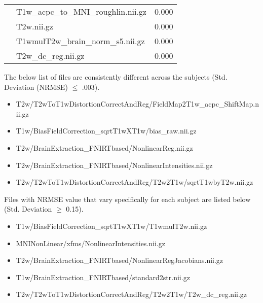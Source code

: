\begin{center}
\begin{tabularx}{\textwidth}{|l|X|X|X|X|}
                                                                & \multicolumn{2}{|l|}{T1w\_acpc\_to\_MNI\_roughlin.nii.gz}                 & \multicolumn{2}{l|}{0.000} \\\cline{2-5}
                                                                & \multicolumn{2}{|l|}{T2w.nii.gz}                            & \multicolumn{2}{l|}{0.000} \\\cline{2-5}
                                                                & \multicolumn{2}{|l|}{T1wmulT2w\_brain\_norm\_s5.nii.gz}     & \multicolumn{2}{l|}{0.000} \\\cline{2-5}
                                                                & \multicolumn{2}{|l|}{T2w\_dc\_reg.nii.gz}                   & \multicolumn{2}{l|}{0.000} \\\cline{1-5}
\end{tabularx}
\label{tab:PreFreeSurfer_comparison_table}
\end{center}
\hfill \break

The below list of files  are consistently different across the subjects (Std. Deviation (NRMSE) $\leq$ .003).
\begin{itemize} 
  \item T2w/T2wToT1wDistortionCorrectAndReg/FieldMap2T1w\_acpc\_ShiftMap.nii.gz
  \item T1w/BiasFieldCorrection\_sqrtT1wXT1w/bias\_raw.nii.gz
  \item T2w/BrainExtraction\_FNIRTbased/NonlinearReg.nii.gz
  \item T2w/BrainExtraction\_FNIRTbased/NonlinearIntensities.nii.gz
  \item T2w/T2wToT1wDistortionCorrectAndReg/T2w2T1w/sqrtT1wbyT2w.nii.gz
\end{itemize}

Files with NRMSE value that vary specifically for each subject are listed below (Std. Deviation $\geq$ 0.15).
\begin{itemize}
  \item T1w/BiasFieldCorrection\_sqrtT1wXT1w/T1wmulT2w.nii.gz
  \item MNINonLinear/xfms/NonlinearIntensities.nii.gz
  \item T2w/BrainExtraction\_FNIRTbased/NonlinearRegJacobians.nii.gz
  \item T1w/BrainExtraction\_FNIRTbased/standard2str.nii.gz
  \item T2w/T2wToT1wDistortionCorrectAndReg/T2w2T1w/T2w\_dc\_reg.nii.gz
\end{itemize}

